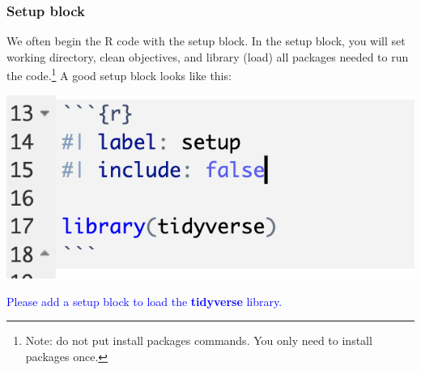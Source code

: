 \documentclass[12pt]{article}
\begin{document}
\subsubsection{Setup block}
We often begin the R code with the setup block. In the setup block, you will set working directory, clean objectives, and library (load) all packages needed to run the code.\footnote{Note: do not put install packages commands. You only need to install
packages once.} A good setup block looks like this:
\begin{center}
    \includegraphics[scale=.7]{setupblock.png}
\end{center}
\textcolor{blue}{Please add a setup block to load the \textbf{tidyverse} library.} 
\end{document}
